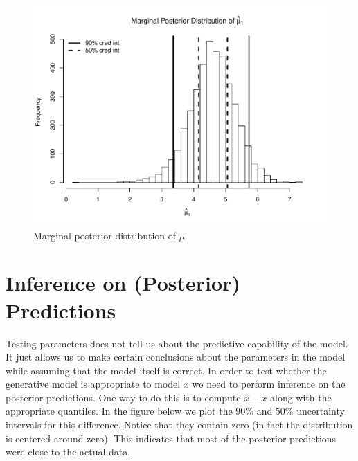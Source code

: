 \documentclass[12pt]{article}
\begin{document}
\begin{figure}[H]\caption[]{Marginal posterior distribution of $\mu$}
\centering
\begin{minipage}{0.6\linewidth}
\includegraphics[trim={0cm 0cm 0cm 1.5cm}, clip, scale=0.6]{../figs/norm1.pdf}
\end{minipage}
\end{figure}

\section{Inference on (Posterior) Predictions}

\noindent Testing parameters does not tell us about the predictive capability of the model. It just allows us to make certain conclusions about the parameters in the model while assuming that the model itself is correct. In order to test whether the generative model is appropriate to model $x$ we need to perform inference on the posterior predictions.
One way to do this is to compute $\hat{x}-x$ along with the appropriate quantiles. In the figure below we plot the 90\% and 50\% uncertainty intervals for this difference. Notice that they contain zero (in fact the distribution is centered around zero). This indicates that most of the posterior predictions were close to the actual data. \\
\end{document}
